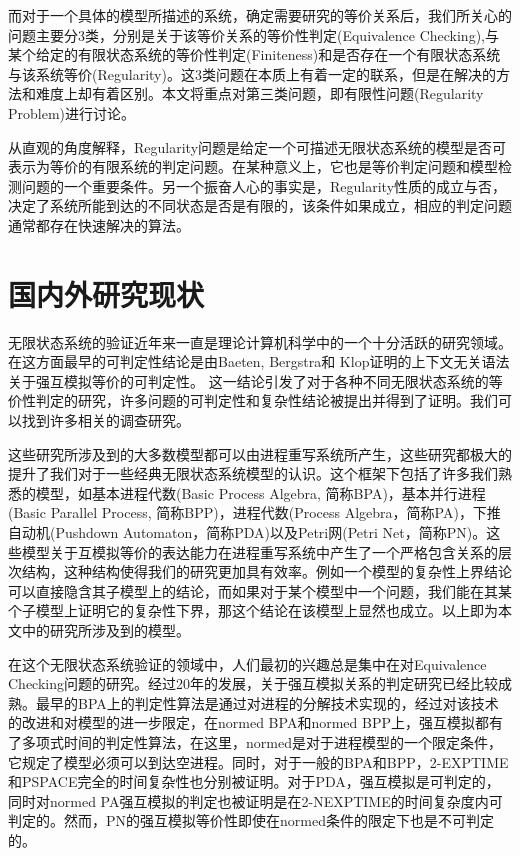 而对于一个具体的模型所描述的系统，确定需要研究的等价关系后，我们所关心的问题主要分3类，分别是关于该等价关系的等价性判定(Equivalence Checking),与某个给定的有限状态系统的等价性判定(Finiteness)和是否存在一个有限状态系统与该系统等价(Regularity)。这3类问题在本质上有着一定的联系，但是在解决的方法和难度上却有着区别。本文将重点对第三类问题，即有限性问题(Regularity Problem)进行讨论。

从直观的角度解释，Regularity问题是给定一个可描述无限状态系统的模型是否可表示为等价的有限系统的判定问题。在某种意义上，它也是等价判定问题和模型检测问题的一个重要条件。另一个振奋人心的事实是，Regularity性质的成立与否，决定了系统所能到达的不同状态是否是有限的，该条件如果成立，相应的判定问题通常都存在快速解决的算法。

\section{国内外研究现状}
\label{sec:state-of-the-art}

无限状态系统的验证近年来一直是理论计算机科学中的一个十分活跃的研究领域。在这方面最早的可判定性结论是由Baeten, Bergstra和 Klop证明的上下文无关语法关于强互模拟等价的可判定性\cite{Baeten1993}。 这一结论引发了对于各种不同无限状态系统的等价性判定的研究，许多问题的可判定性和复杂性结论被提出并得到了证明。我们可以找到许多相关的调查研究\cite{Burkart2001, Kucera2006, Moller2004, Srba2002}。

这些研究所涉及到的大多数模型都可以由进程重写系统所产生\cite{Mayr2000}，这些研究都极大的提升了我们对于一些经典无限状态系统模型的认识。这个框架下包括了许多我们熟悉的模型，如基本进程代数(Basic Process Algebra, 简称BPA)\cite{Bergstra1985}，基本并行进程(Basic Parallel Process, 简称BPP)\cite{Christensen1993}，进程代数(Process Algebra，简称PA)\cite{Baeten1990}，下推自动机(Pushdown Automaton，简称PDA)\cite{Hopcroft1979}以及Petri网(Petri Net，简称PN)\cite{Peterson1977}。这些模型关于互模拟等价的表达能力在进程重写系统中产生了一个严格包含关系的层次结构，这种结构使得我们的研究更加具有效率。例如一个模型的复杂性上界结论可以直接隐含其子模型上的结论，而如果对于某个模型中一个问题，我们能在其某个子模型上证明它的复杂性下界，那这个结论在该模型上显然也成立。以上即为本文中的研究所涉及到的模型。

在这个无限状态系统验证的领域中，人们最初的兴趣总是集中在对Equivalence Checking问题的研究。经过20年的发展，关于强互模拟关系的判定研究已经比较成熟。最早的BPA上的判定性算法是通过对进程的分解技术实现的\cite{Baeten1993,Christensen1992}，经过对该技术的改进和对模型的进一步限定，在normed BPA和normed BPP上，强互模拟都有了多项式时间的判定性算法\cite{Hirshfeld,Hirshfelda}，在这里，normed是对于进程模型的一个限定条件，它规定了模型必须可以到达空进程。同时，对于一般的BPA和BPP，2-EXPTIME和PSPACE完全的时间复杂性也分别被证明\cite{Burkart1995,Jancar2012,Jancar2003}。对于PDA，强互模拟是可判定的\cite{Senizergues1998,Stirling1998}，同时对normed PA强互模拟的判定也被证明是在2-NEXPTIME的时间复杂度内可判定的\cite{Hirshfeldb}。然而，PN的强互模拟等价性即使在normed条件的限定下也是不可判定的\cite{Jancar1995}。 

